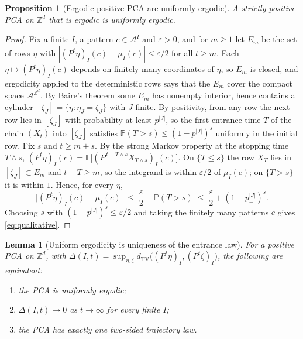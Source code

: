 \documentclass[11pt]{article}
\theoremstyle{plain}
\newtheorem{proposition}[theorem]{Proposition}
\newtheorem{lemma}[theorem]{Lemma}
\theoremstyle{definition}
\theoremstyle{remark}
\newcommand{\A}{\mathcal{A}}
\newcommand{\Z}{\mathbb{Z}}
\newcommand{\E}{\mathbb{E}}
\newcommand{\Prob}{\mathbb{P}}
\newcommand{\dtv}{d_{\mathrm{TV}}}
\newcommand{\eps}{\varepsilon}
\begin{document}
\begin{proposition}[Ergodic positive PCA are uniformly ergodic]
\label{prop:halawi}
A strictly positive PCA on $\Z^d$ that is ergodic is uniformly ergodic.
\end{proposition}

\begin{proof}
Fix a finite $I$, a pattern $c\in\A^I$ and $\eps>0$, and for $m\ge1$ let $E_m$ be the set of rows $\eta$ with $|(P^t\eta)_I(c)-\mu_I(c)|\le\eps/2$ for all $t\ge m$. Each $\eta\mapsto(P^t\eta)_I(c)$ depends on finitely many coordinates of $\eta$, so $E_m$ is closed, and ergodicity applied to the deterministic rows says that the $E_m$ cover the compact space $\A^{\Z^d}$. By Baire's theorem some $E_m$ has nonempty interior, hence contains a cylinder $[\zeta_J]=\{\eta:\eta_J=\zeta_J\}$ with $J$ finite. By positivity, from any row the next row lies in $[\zeta_J]$ with probability at least $p_-^{|J|}$, so the first entrance time $T$ of the chain $(X_t)$ into $[\zeta_J]$ satisfies $\Prob(T>s)\le(1-p_-^{|J|})^s$ uniformly in the initial row. Fix $s$ and $t\ge m+s$. By the strong Markov property at the stopping time $T\wedge s$, $(P^t\eta)_I(c)=\E\bigl[(P^{\,t-T\wedge s}X_{T\wedge s})_I(c)\bigr]$. On $\{T\le s\}$ the row $X_T$ lies in $[\zeta_J]\subset E_m$ and $t-T\ge m$, so the integrand is within $\eps/2$ of $\mu_I(c)$; on $\{T>s\}$ it is within $1$. Hence, for every $\eta$,
\[
\bigl|(P^t\eta)_I(c)-\mu_I(c)\bigr|\;\le\;\frac\eps2+\Prob(T>s)\;\le\;\frac\eps2+(1-p_-^{|J|})^s.
\]
Choosing $s$ with $(1-p_-^{|J|})^s\le\eps/2$ and taking the finitely many patterns $c$ gives \eqref{eq:qualitative}.
\end{proof}

\begin{lemma}[Uniform ergodicity is uniqueness of the entrance law]
\label{lem:entrance}
For a positive PCA on $\Z^d$, with $\Delta(I,t)=\sup_{\eta,\zeta}\dtv\bigl((P^t\eta)_I,(P^t\zeta)_I\bigr)$, the following are equivalent:
\begin{enumerate}[label=\textup{(\roman*)}]
\item the PCA is uniformly ergodic;
\item $\Delta(I,t)\to0$ as $t\to\infty$ for every finite $I$;
\item the PCA has exactly one two-sided trajectory law.
\end{enumerate}
\end{lemma}
\end{document}
